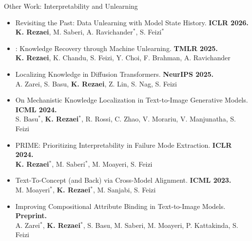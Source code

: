 \documentclass[aspectratio=169]{beamer}
\begin{document}
\begin{frame}{Other Work: Interpretability and Unlearning}
    \vspace{-0.2em}
    {\scriptsize
        \begin{itemize}\setlength\itemsep{4pt}
            \item Revisiting the Past: Data Unlearning with Model State History. \textcolor{xattn}{\textbf{ICLR 2026.}}\\
                  {\color{gray!45!black}\textbf{K. Rezaei}, M. Saberi, A. Ravichander$^*$, S. Feizi$^*$}
            \item \RESTOR: Knowledge Recovery through Machine Unlearning. \textcolor{xattn}{\textbf{TMLR 2025.}}\\
                  {\color{gray!45!black}\textbf{K. Rezaei}, K. Chandu, S. Feizi, Y. Choi, F. Brahman, A. Ravichander}
            \item Localizing Knowledge in Diffusion Transformers. \textcolor{xattn}{\textbf{NeurIPS 2025.}}\\
                  {\color{gray!45!black}A. Zarei, S. Basu, \textbf{K. Rezaei}, Z. Lin, S. Nag, S. Feizi}
            \item On Mechanistic Knowledge Localization in Text-to-Image Generative Models. \textcolor{xattn}{\textbf{ICML 2024.}}\\
                  {\color{gray!45!black}S. Basu$^*$, \textbf{K. Rezaei}$^*$, R. Rossi, C. Zhao, V. Morariu, V. Manjunatha, S. Feizi}
            \item PRIME: Prioritizing Interpretability in Failure Mode Extraction. \textcolor{xattn}{\textbf{ICLR 2024.}}\\
                  {\color{gray!45!black}\textbf{K. Rezaei}$^*$, M. Saberi$^*$, M. Moayeri, S. Feizi}
            \item Text-To-Concept (and Back) via Cross-Model Alignment. \textcolor{xattn}{\textbf{ICML 2023.}}\\
                  {\color{gray!45!black}M. Moayeri$^*$, \textbf{K. Rezaei}$^*$, M. Sanjabi, S. Feizi}
            \item Improving Compositional Attribute Binding in Text-to-Image Models. \textcolor{xattn}{\textbf{Preprint.}}\\
                  {\color{gray!45!black}A. Zarei$^*$, \textbf{K. Rezaei}$^*$, S. Basu, M. Saberi, M. Moayeri, P. Kattakinda, S. Feizi}
        \end{itemize}}
\end{frame}
\end{document}
